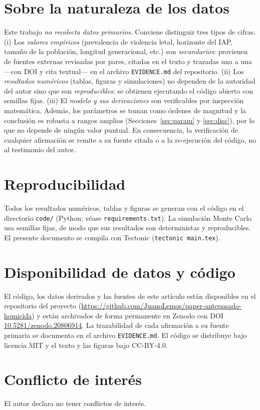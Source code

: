 \documentclass[11pt]{article}
\begin{document}
\section*{Sobre la naturaleza de los datos}
Este trabajo \emph{no recolecta datos primarios}. Conviene distinguir tres tipos
de cifras. (i) Los \emph{valores emp\'iricos} (prevalencia de violencia letal,
horizonte del IAP, tama\~no de la poblaci\'on, longitud generacional, etc.) son
\emph{secundarios}: provienen de fuentes externas revisadas por pares, citadas en
el texto y trazadas una a una ---con DOI y cita textual--- en el archivo
\texttt{EVIDENCE.md} del repositorio. (ii) Los \emph{resultados num\'ericos}
(tablas, figuras y simulaciones) no dependen de la autoridad del autor sino que
son \emph{reproducibles}: se obtienen ejecutando el c\'odigo abierto con semillas
fijas. (iii) El \emph{modelo y sus derivaciones} son verificables por inspecci\'on
matem\'atica. Adem\'as, los par\'ametros se toman como \'ordenes de magnitud y la
conclusi\'on es robusta a rangos amplios (Secciones~\ref{sec:param} y
\ref{sec:disc}), por lo que no depende de ning\'un valor puntual. En consecuencia,
la verificaci\'on de cualquier afirmaci\'on se remite a su fuente citada o a la
re-ejecuci\'on del c\'odigo, no al testimonio del autor.

\section*{Reproducibilidad}
Todos los resultados num\'ericos, tablas y figuras se generan con el c\'odigo en
el directorio \texttt{code/} (Python; v\'ease \texttt{requirements.txt}). La
simulaci\'on Monte Carlo usa semillas fijas, de modo que sus resultados son
deterministas y reproducibles. El presente documento se compila con Tectonic
(\texttt{tectonic main.tex}).

\section*{Disponibilidad de datos y c\'odigo}
El c\'odigo, los datos derivados y las fuentes de este art\'iculo est\'an
disponibles en el repositorio del proyecto
(\url{https://github.com/JuanoLemos/paper-antepasado-homicida}) y est\'an
archivados de forma permanente en Zenodo con DOI
\href{https://doi.org/10.5281/zenodo.20806914}{10.5281/zenodo.20806914}. La
trazabilidad de cada afirmaci\'on a su fuente primaria se documenta en el archivo
\texttt{EVIDENCE.md}. El c\'odigo se distribuye bajo licencia MIT y el texto y
las figuras bajo CC-BY-4.0.

\section*{Conflicto de inter\'es}
El autor declara no tener conflictos de inter\'es.



\end{document}
